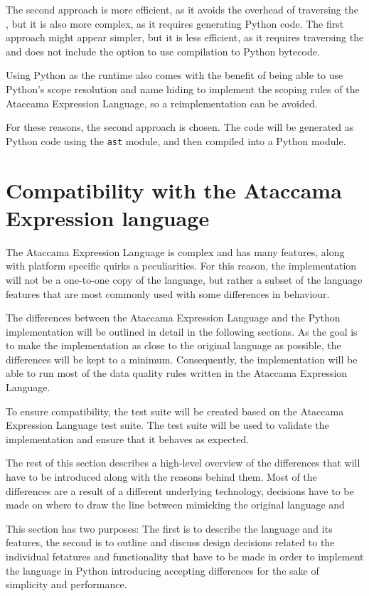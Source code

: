 The second approach is more efficient, as it avoids the overhead of traversing the , but it is also more complex, as it requires generating Python code. The first approach might appear simpler, but it is less efficient, as it requires traversing the  and does not include the option to use compilation to Python bytecode.

Using Python as the runtime also comes with the benefit of being able to use Python's scope resolution and name hiding to implement the scoping rules of the Ataccama Expression Language, so a reimplementation can be avoided.

For these reasons, the second approach is chosen. The code will be generated as Python code using the \texttt{ast} module, and then compiled into a Python module.

\section{Compatibility with the Ataccama Expression language}

The Ataccama Expression Language is complex and has many features, along with
platform specific quirks a peculiarities. For this reason, the implementation will
not be a one-to-one copy of the language, but rather a subset of the language
features that are most commonly used with some differences in behaviour.

The differences between the Ataccama Expression Language and the Python
implementation will be outlined in detail in the following sections. As the goal
is to make the implementation as close to the original language as possible, the
differences will be kept to a minimum. Consequently, the implementation will be
able to run most of the data quality rules written in the Ataccama Expression
Language.

To ensure compatibility, the test suite will be created based on the Ataccama Expression Language test suite. The test suite will be used to validate the implementation and ensure that it behaves as expected.

The rest of this section describes a high-level overview of the differences that
will have to be introduced along with the reasons behind them. Most of the
differences are a result of a different underlying technology, decisions have to be
made on where to draw the line between mimicking the original language and

This section has two purposes: The first is to describe the language and its features, the second is to outline and discuss design decisions related to the individual fetatures and functionality that have to be made in order to implement the language in Python 
introducing accepting differences for the sake of simplicity and performance.

